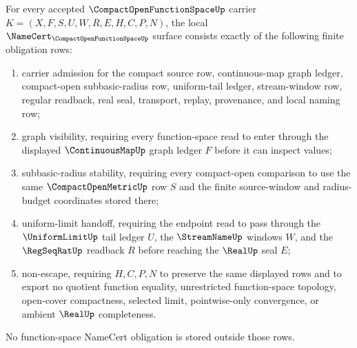 \begin{theorem}
\label{thm:compact-open-function-space-namecert-obligations}
For every accepted $\CompactOpenFunctionSpaceUp$ carrier $K=(X,F,S,U,W,R,E,H,C,P,N)$, the local $\NameCert_{\CompactOpenFunctionSpaceUp}$ surface consists exactly of the following finite obligation rows:
\begin{enumerate}
\item carrier admission for the compact source row, continuous-map graph ledger, compact-open subbasic-radius row, uniform-tail ledger, stream-window row, regular readback, real seal, transport, replay, provenance, and local naming row;
\item graph visibility, requiring every function-space read to enter through the displayed $\ContinuousMapUp$ graph ledger $F$ before it can inspect values;
\item subbasic-radius stability, requiring every compact-open comparison to use the same $\CompactOpenMetricUp$ row $S$ and the finite source-window and radius-budget coordinates stored there;
\item uniform-limit handoff, requiring the endpoint read to pass through the $\UniformLimitUp$ tail ledger $U$, the $\StreamNameUp$ windows $W$, and the $\RegSeqRatUp$ readback $R$ before reaching the $\RealUp$ seal $E$;
\item non-escape, requiring $H,C,P,N$ to preserve the same displayed rows and to export no quotient function equality, unrestricted function-space topology, open-cover compactness, selected limit, pointwise-only convergence, or ambient $\RealUp$ completeness.
\end{enumerate}
No function-space NameCert obligation is stored outside those rows.
\end{theorem}
